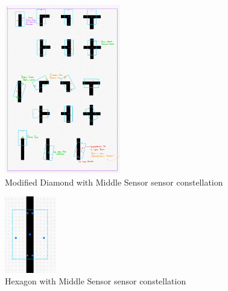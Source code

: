 \documentclass[conference]{IEEEtran}
\begin{document}
\begin{figure}[htbp]
	\centerline{\includegraphics[width=0.45\textwidth]{constellation-diamond-middle.png}}
	\caption{Modified Diamond with Middle Sensor sensor constellation}
	\label{fig:constellation-diamond-middle}
\end{figure}
\begin{figure}[htbp]
	\centerline{\includegraphics[width=0.2\textwidth]{constellation-hexagon-middle.png}}
	\caption{Hexagon with Middle Sensor sensor constellation}
	\label{fig:constellation-hexagon-middle}
\end{figure}
\end{document}
